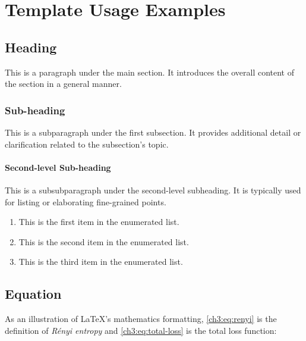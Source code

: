 \chapter{Template Usage Examples}
\label{chapter3}

\section{Heading}
\begin{paragraph}
This is a paragraph under the main section. It introduces the overall content of the section in a general manner.
\end{paragraph}

\subsection{Sub-heading}
\begin{subparagraph}
This is a subparagraph under the first subsection. It provides additional detail or clarification related to the subsection's topic.
\end{subparagraph}

\subsubsection{Second-level Sub-heading}
\begin{subsubparagraph}
This is a subsubparagraph under the second-level subheading. It is typically used for listing or elaborating fine-grained points.
\end{subsubparagraph}

\begin{enumerate}[itemindent=\subsubparitemindent]
    \item This is the first item in the enumerated list.
    \item This is the second item in the enumerated list.
    \item This is the third item in the enumerated list.
\end{enumerate}

\section{Equation}
\begin{paragraph}
As an illustration of \LaTeX's mathematics formatting, \autoref{ch3:eq:renyi} is the definition of {\em R\'enyi entropy} and \autoref{ch3:eq:total-loss} is the total loss function:
\end{paragraph}

